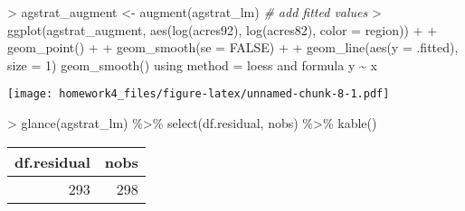 \documentclass[
]{article}
\newenvironment{Shaded}{\begin{snugshade}}{\end{snugshade}}
\newcommand{\AttributeTok}[1]{\textcolor[rgb]{0.77,0.63,0.00}{#1}}
\newcommand{\CommentTok}[1]{\textcolor[rgb]{0.56,0.35,0.01}{\textit{#1}}}
\newcommand{\ConstantTok}[1]{\textcolor[rgb]{0.00,0.00,0.00}{#1}}
\newcommand{\DecValTok}[1]{\textcolor[rgb]{0.00,0.00,0.81}{#1}}
\newcommand{\FunctionTok}[1]{\textcolor[rgb]{0.00,0.00,0.00}{#1}}
\newcommand{\NormalTok}[1]{#1}
\newcommand{\OtherTok}[1]{\textcolor[rgb]{0.56,0.35,0.01}{#1}}
\newcommand{\SpecialCharTok}[1]{\textcolor[rgb]{0.00,0.00,0.00}{#1}}
\newcommand{\StringTok}[1]{\textcolor[rgb]{0.31,0.60,0.02}{#1}}
\begin{document}
\begin{Shaded}
\begin{Highlighting}[]
\SpecialCharTok{\textgreater{}}\NormalTok{ agstrat\_augment }\OtherTok{\textless{}{-}} \FunctionTok{augment}\NormalTok{(agstrat\_lm)  }\CommentTok{\# add fitted values}
\SpecialCharTok{\textgreater{}} \FunctionTok{ggplot}\NormalTok{(agstrat\_augment, }\FunctionTok{aes}\NormalTok{(}\StringTok{\textasciigrave{}}\AttributeTok{log(acres92)}\StringTok{\textasciigrave{}}\NormalTok{, }\StringTok{\textasciigrave{}}\AttributeTok{log(acres82)}\StringTok{\textasciigrave{}}\NormalTok{, }\AttributeTok{color =}\NormalTok{ region)) }\SpecialCharTok{+} 
\SpecialCharTok{+}   \FunctionTok{geom\_point}\NormalTok{() }\SpecialCharTok{+} 
\SpecialCharTok{+}   \FunctionTok{geom\_smooth}\NormalTok{(}\AttributeTok{se =} \ConstantTok{FALSE}\NormalTok{) }\SpecialCharTok{+} 
\SpecialCharTok{+}   \FunctionTok{geom\_line}\NormalTok{(}\FunctionTok{aes}\NormalTok{(}\AttributeTok{y =}\NormalTok{ .fitted), }\AttributeTok{size =} \DecValTok{1}\NormalTok{)}
\StringTok{\textasciigrave{}}\AttributeTok{geom\_smooth()}\StringTok{\textasciigrave{}}\NormalTok{ using method }\OtherTok{=} \StringTok{\textquotesingle{}loess\textquotesingle{}}\NormalTok{ and formula }\StringTok{\textquotesingle{}y \textasciitilde{} x\textquotesingle{}}
\end{Highlighting}
\end{Shaded}

\texttt{[image: homework4\_files/figure-latex/unnamed-chunk-8-1.pdf]}

\begin{Shaded}
\begin{Highlighting}[]
\SpecialCharTok{\textgreater{}} \FunctionTok{glance}\NormalTok{(agstrat\_lm) }\SpecialCharTok{\%\textgreater{}\%} \FunctionTok{select}\NormalTok{(df.residual, nobs) }\SpecialCharTok{\%\textgreater{}\%} \FunctionTok{kable}\NormalTok{()}
\end{Highlighting}
\end{Shaded}

\begin{longtable}[]{@{}rr@{}}
\toprule
df.residual & nobs \\
\midrule
\endhead
293 & 298 \\
\bottomrule
\end{longtable}
\end{document}
